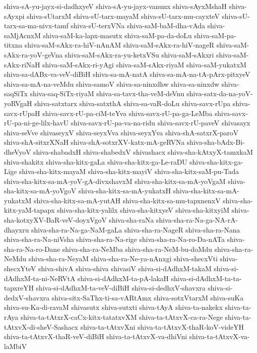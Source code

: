 {shiva-sA-yu-jayx-si-dadhxyeV
shiva-sA-yu-jayx-vanunx
shiva-sAyxMshaH
shiva-sAyxpi
shiva-sUtarxM
shiva-sU-tarx-mayaM
shiva-sU-tarx-mu-cayxteV
shiva-sU-tarx-sa-ma-nivx-tamf
shiva-sU-terxVNa
shiva-saM-baM-dha-vAda
shiva-saMjAcnxM
shiva-saM-ka-lapx-masutx
shiva-saM-pa-da-doLu
shiva-saM-pa-titxna
shiva-saM-sAkx-ra-hiV-nAnAM
shiva-saM-sAkx-ra-hiV-nageR
shiva-saM-sAkx-ra-yoV-geVna
shiva-saM-sAkx-ra-yu-ketxVSu
shiva-saM-sAkxri
shiva-saM-sAkx-riNaH
shiva-saM-sAkx-ri-yAgi
shiva-saM-sAkx-riyaM
shiva-saM-yukatxM
shiva-sa-dABx-va-veV-diBiH
shiva-sa-mA-natA
shiva-sa-mA-na-tA-pArx-pitxyeV
shiva-sa-mA-na-veMdu
shiva-samoV
shiva-sa-ninxdhw
shiva-sa-ninxdw
shiva-saqSiTx
shiva-saq-SiTx-riyaM
shiva-sa-tavx-tha-veM-deVnu
shiva-satx-da-na-yoV-yoRVgaH
shiva-satxtarx
shiva-satxthA
shiva-sa-vaR-doLu
shiva-savx-rUpa
shiva-savx-rUpaH
shiva-savx-rU-pa-ciM-teYva
shiva-savx-rU-pa-ga-LeMba
shiva-savx-rU-pa-ni-ge-lilx-havU
shiva-savx-rU-pa-va-na-ridu
shiva-savx-rU-paveV
shivasayx
shiva-seVve
shivaseyxV
shiva-seyxVva
shiva-seyxYva
shiva-shA-satxrX-paroV
shiva-shA-sitxrXNaH
shiva-shA-sotxrXV-katx-mA-geRVNa
shiva-sha-bAdx-Bi-dheVyoV
shiva-shabadxH
shiva-shabedxV
shivashacx
shiva-sha-kAtxyX-tamxkaM
shiva-shakitx
shiva-sha-kitx-gaLa
shiva-sha-kitx-ga-Le-raDU
shiva-sha-kitx-ga-Lige
shiva-sha-kitx-mayaM
shiva-sha-kitx-mayiV
shiva-sha-kitx-saM-pu-Tada
shiva-sha-kitx-sa-mA-yoV-gA-divxshavxM
shiva-sha-kitx-sa-mA-yoVgaM
shiva-sha-kitx-sa-mA-yoVgoV
shiva-sha-kitx-sa-mA-yukatxH
shiva-sha-kitx-sa-mA-yukatxM
shiva-sha-kitx-sa-mA-yutAH
shiva-sha-kitx-sa-mu-tapxnenxV
shiva-sha-kitx-yaM-tapapx
shiva-sha-kitx-yalilx
shiva-sha-kitxyeV
shiva-sha-kitxyiM
shiva-sha-kotxyXV-BaR-veV-doyxVgoV
shiva-sha-raNa
shiva-sha-ra-Na-ga-NA-rA-dhayxru
shiva-sha-ra-Na-ga-NaM-gaLa
shiva-sha-ra-NageR
shiva-sha-ra-Nana
shiva-sha-ra-Na-niVsha
shiva-sha-ra-Na-rige
shiva-sha-ra-Na-ro-Da-nATa
shiva-sha-ra-Na-ro-Dane
shiva-sha-ra-NeMba
shiva-sha-ra-NeM-bu-doMdu
shiva-sha-ra-NeMdu
shiva-sha-ra-NeyaM
shiva-sha-ra-Ne-ya-nAnxgi
shiva-shecxVti
shiva-shecxYteV
shiva-shivA
shiva-shiva
shivasiV
shiva-si-dAdhxM-takaM
shiva-si-dAdhxM-ta-ni-NeRVtA
shiva-si-dAdhxM-ta-pA-lakaH
shiva-si-dAdhxM-ta-ta-tapxreYH
shiva-si-dAdhxM-ta-veV-diBiH
shiva-si-dedhxV-shavxra
shiva-si-dedxV-shavxra
shiva-sitx-SaThx-ti-sa-vARtAmx
shiva-sotxVtarxM
shiva-suKa
shiva-su-Ka-di-ravaM
shivasutx
shiva-sutxti
shiva-tAyA
shiva-ta-nakekx
shiva-ta-rAya
shiva-ta-tAtxrX-caCx-kitx-tatatxvXM
shiva-ta-tAtxvX-ca-ra-Nege
shiva-ta-tAtxvX-di-sheV-Sashacx
shiva-ta-tAtxvXni
shiva-ta-tAtxvX-thaR-koV-videYH
shiva-ta-tAtxvX-thaR-veV-diBiH
shiva-ta-tAtxvX-va-dhiVni
shiva-ta-tAtxvX-va-laMbiV
}
